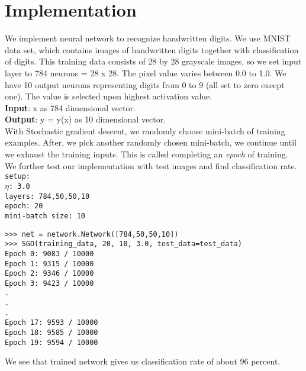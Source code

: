 \section{Implementation}
We implement neural network to recognize handwritten digits. We use MNIST data set, which contains images of handwritten digits together with classification of digits. This training data consists of 28 by 28 grayscale images, so we set input layer to 784 neurons = 28 x 28. The pixel value varies between 0.0 to 1.0. We have 10 output neurons representing digits from 0 to 9 (all set to zero except one). The value is selected upon highest activation value.\\
\textbf{Input}: x as 784 dimensional vector.\\
\textbf{Output}: y = y(x) as 10 dimensional vector.\\
With Stochastic gradient descent, we randomly choose mini-batch of training examples. After, we pick another randomly chosen mini-batch, we continue until we exhaust the training inputs. This is called completing an \textit{epoch} of training.\\
We further test our implementation with test images and find classification rate.
\texttt{setup:\\
$\eta$: 3.0\\
layers: 784,50,50,10 \\
epoch: 20\\ 
mini-batch size: 10
}

\begin{lstlisting}
>>> net = network.Network([784,50,50,10])
>>> SGD(training_data, 20, 10, 3.0, test_data=test_data)
Epoch 0: 9083 / 10000
Epoch 1: 9315 / 10000
Epoch 2: 9346 / 10000
Epoch 3: 9423 / 10000
.
.
.
Epoch 17: 9593 / 10000
Epoch 18: 9585 / 10000
Epoch 19: 9594 / 10000
\end{lstlisting}

We see that trained network gives us classification rate of about 96 percent.